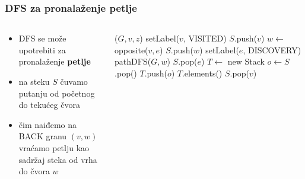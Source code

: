 \documentclass[compress]{beamer}
\begin{document}
\begin{frame}[fragile,shrink=3]
  \frametitle{DFS za pronalaženje petlje}
  {\footnotesize
  \begin{columns}
    \begin{column}[t]{6cm}
      \begin{itemize}
        \item DFS se može upotrebiti za pronalaženje \textbf{petlje} 
        \item na steku $S$ čuvamo putanju od početnog do tekućeg čvora
        \item čim naiđemo na {\scriptsize BACK} granu $(v,w)$ vraćamo
          petlju kao sadržaj steka od vrha do čvora $w$
      \end{itemize}
    \end{column}
    \begin{column}[t]{6cm}
      \begin{algorithmic}
        \STATE {}($G,v,z$)
        \STATE setLabel($v$, {\scriptsize VISITED})
        \STATE $S$.push($v$)
            \STATE $w \leftarrow$ opposite($v,e$)
            \STATE $S$.push($w$)
              \STATE setLabel($e$, {\scriptsize DISCOVERY})
              \STATE pathDFS($G, w$)
              \STATE $S$.pop($e$)
            \ELSE
              \STATE $T \leftarrow$ new Stack
              \REPEAT
                \STATE $o \leftarrow S$.pop()
                \STATE $T$.push($o$)
              \RETURN $T$.elements()
            \ENDIF
          \ENDIF
        \ENDFOR
        \STATE $S$.pop($v$)
      \end{algorithmic}
    \end{column}
  \end{columns}
  }
\end{frame}
\end{document}
